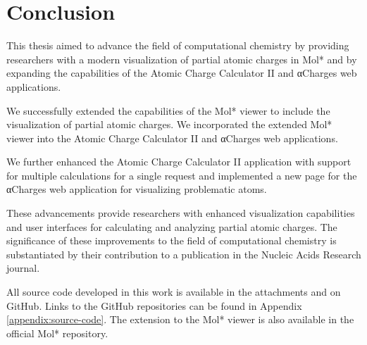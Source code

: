\documentclass[
  digital,     %
  oneside,     %
  nosansbold,  %
  nocolorbold, %
  lof,         %
  lot,         %
]{fithesis4}
\begin{document}
\newpage
\chapter*{Conclusion}

This thesis aimed to advance the field of computational chemistry by providing researchers with a modern visualization of partial atomic charges in Mol* and by expanding the capabilities of the Atomic Charge Calculator II and αCharges web applications.

We successfully extended the capabilities of the Mol* viewer to include the visualization of partial atomic charges. We incorporated the extended Mol* viewer into the Atomic Charge Calculator II and αCharges web applications.

We further enhanced the Atomic Charge Calculator II application with support for multiple calculations for a single request and implemented a new page for the αCharges web application for visualizing problematic atoms.

These advancements provide researchers with enhanced visualization capabilities and user interfaces for calculating and analyzing partial atomic charges. The significance of these improvements to the field of computational chemistry is substantiated by their contribution to a publication in the Nucleic Acids Research journal.

All source code developed in this work is available in the attachments and on GitHub. Links to the GitHub repositories can be found in Appendix \ref{appendix:source-code}. The extension to the Mol* viewer is also available in the official Mol* repository. 

\printbibliography[heading=bibintoc]

\renewcommand\appendixname{Appendix}
\newpage
\end{document}
